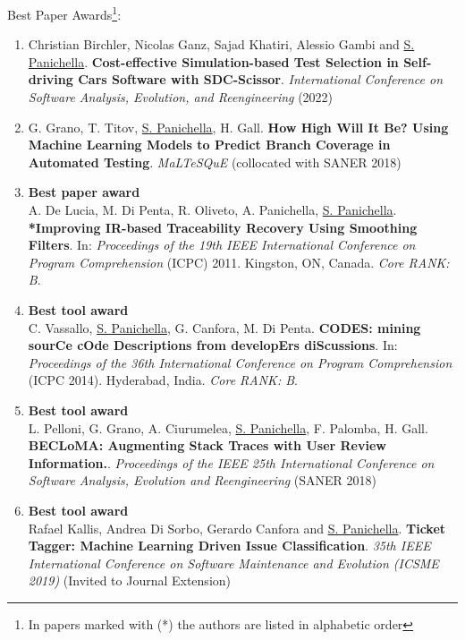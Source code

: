 \documentclass[10pt]{article}
\begin{document}
Best Paper Awards\footnote{
 In papers marked with (*)  the authors are listed in alphabetic order}: %
\begin{enumerate}
 \item  Christian Birchler, Nicolas Ganz, Sajad Khatiri, Alessio Gambi and \underline{S. Panichella}. \textbf{Cost-effective Simulation-based Test Selection in Self-driving Cars Software with SDC-Scissor}.  \emph{International Conference on Software Analysis, Evolution, and Reengineering}  (2022) 
 
 \item  G. Grano, T. Titov, \underline{S. Panichella}, H. Gall. \textbf{How High Will It Be? Using Machine Learning Models to Predict Branch Coverage in Automated Testing}.  \emph{MaLTeSQuE}  (collocated with SANER 2018) 
 
\item \textbf{Best paper award}\\
A. De Lucia, M. Di Penta, R. Oliveto, A. Panichella, \underline{S. Panichella}. \textbf{*Improving IR-based Traceability Recovery Using Smoothing Filters}. In: \emph{Proceedings of the 19th IEEE International Conference on Program Comprehension} (ICPC) 2011. Kingston, ON, Canada.  \textit{Core RANK: B}.
\item \textbf{Best tool award}\\
 C. Vassallo, \underline{S. Panichella}, G. Canfora, M. Di Penta. \textbf{CODES: mining sourCe cOde Descriptions from developErs diScussions}. In: \emph{Proceedings of the 36th International Conference on Program Comprehension} (ICPC 2014). Hyderabad, India.  \textit{Core RANK: B}.
 \item \textbf{Best tool award}\\
 L. Pelloni, G. Grano, A. Ciurumelea, \underline{S. Panichella}, F. Palomba, H. Gall. \textbf{BECLoMA: Augmenting Stack Traces with User Review Information.}.  \emph{Proceedings of the  {IEEE} 25th International Conference on Software Analysis, Evolution and Reengineering}  (SANER 2018)
 \item  \textbf{Best tool award}\\Rafael Kallis, Andrea Di Sorbo, Gerardo Canfora and \underline{S. Panichella}. \textbf{Ticket Tagger: Machine Learning Driven Issue Classification}.  \emph{35th IEEE International Conference on Software Maintenance and Evolution (ICSME 2019)}  (Invited to Journal Extension) 
\end{enumerate}
\end{document}
